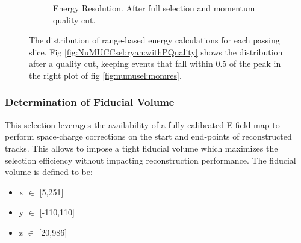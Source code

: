 \begin{figure}[ht]
\begin{center}
\begin{subfigure}[b]{0.45\textwidth}
    \caption{\label{fig:NuMUCCsel:ryan:Eres_withPQuality} Energy Resolution. After full selection and momentum quality cut.}
    \end{subfigure}
\caption{The distribution of range-based energy calculations for each passing slice. Fig \ref{fig:NuMUCCsel:ryan:withPQuality} shows the distribution after a quality cut, keeping events that fall within 0.5 of the peak in the right plot of fig \ref{fig:numusel:momres}.}
\label{fig:NuMUCCsel:ryan:PQuality}
\end{center}
\end{figure}


\subsubsection{Determination of Fiducial Volume}
\label{sssec:NuMUCCsel:constr:FV}

\par This selection leverages the availability of a fully calibrated E-field map to perform space-charge corrections on the start and end-points of reconstructed tracks. This allows to impose a tight fiducial volume which maximizes the selection efficiency without impacting reconstruction performance. The fiducial volume is defined to be: 

\begin{itemize}
    \item x $\in$ [5,251]
    \item y $\in$ [-110,110]
    \item z $\in$ [20,986]
\end{itemize}

